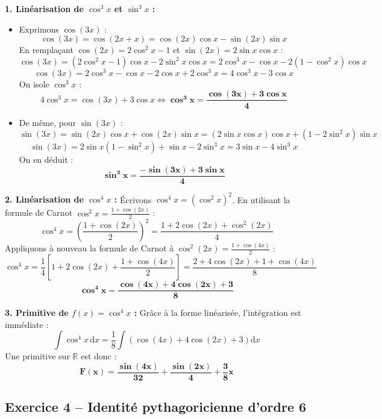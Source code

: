 \documentclass[11pt,a4paper]{article}
\newcommand{\R}{\mathbb{R}}
\newcommand{\dd}{\mathrm{d}}
\begin{document}
\begin{correctionbox}
\textbf{1. Linéarisation de $\cos^3 x$ et $\sin^3 x$ :}
\begin{itemize}[label=$\bullet$]
    \item Exprimons $\cos(3x)$ :
    \[
    \cos(3x) = \cos(2x + x) = \cos(2x)\cos x - \sin(2x)\sin x
    \]
    En remplaçant $\cos(2x) = 2\cos^2 x - 1$ et $\sin(2x) = 2\sin x \cos x$ :
    \[
    \cos(3x) = (2\cos^2 x - 1)\cos x - 2\sin^2 x \cos x = 2\cos^3 x - \cos x - 2(1 - \cos^2 x)\cos x
    \]
    \[
    \cos(3x) = 2\cos^3 x - \cos x - 2\cos x + 2\cos^3 x = 4\cos^3 x - 3\cos x
    \]
    On isole $\cos^3 x$ :
    \[
    4\cos^3 x = \cos(3x) + 3\cos x \iff \mathbf{\cos^3 x = \frac{\cos(3x) + 3\cos x}{4}}
    \]
    \item De même, pour $\sin(3x)$ :
    \[
    \sin(3x) = \sin(2x)\cos x + \cos(2x)\sin x = (2\sin x \cos x)\cos x + (1 - 2\sin^2 x)\sin x
    \]
    \[
    \sin(3x) = 2\sin x (1 - \sin^2 x) + \sin x - 2\sin^3 x = 3\sin x - 4\sin^3 x
    \]
    On en déduit :
    \[
    \mathbf{\sin^3 x = \frac{-\sin(3x) + 3\sin x}{4}}
    \]
\end{itemize}

\textbf{2. Linéarisation de $\cos^4 x$ :}
Écrivons $\cos^4 x = (\cos^2 x)^2$. En utilisant la formule de Carnot $\cos^2 x = \frac{1 + \cos(2x)}{2}$ :
\[
\cos^4 x = \left(\frac{1 + \cos(2x)}{2}\right)^2 = \frac{1 + 2\cos(2x) + \cos^2(2x)}{4}
\]
Appliquons à nouveau la formule de Carnot à $\cos^2(2x) = \frac{1 + \cos(4x)}{2}$ :
\[
\cos^4 x = \frac{1}{4} \left[ 1 + 2\cos(2x) + \frac{1 + \cos(4x)}{2} \right] = \frac{2 + 4\cos(2x) + 1 + \cos(4x)}{8}
\]
\[
\mathbf{\cos^4 x = \frac{\cos(4x) + 4\cos(2x) + 3}{8}}
\]

\textbf{3. Primitive de $f(x) = \cos^4 x$ :}
Grâce à la forme linéarisée, l'intégration est immédiate :
\[
\int \cos^4 x \, \dd x = \frac{1}{8} \int \left(\cos(4x) + 4\cos(2x) + 3\right) \dd x
\]
Une primitive sur $\R$ est donc :
\[
\mathbf{F(x) = \frac{\sin(4x)}{32} + \frac{\sin(2x)}{4} + \frac{3}{8}x}
\]
\end{correctionbox}

\vspace{0.3cm}

\subsection*{Exercice 4 -- Identité pythagoricienne d'ordre 6}
\end{document}
